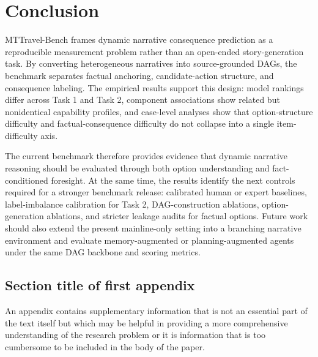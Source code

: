 \documentclass[pdflatex,sn-mathphys-num]{sn-jnl}%
\theoremstyle{thmstyleone}%
\theoremstyle{thmstyletwo}%
\theoremstyle{thmstylethree}%
\begin{document}
\section{Conclusion}
MTTravel-Bench frames dynamic narrative consequence prediction as a reproducible measurement problem rather than an open-ended story-generation task. By converting heterogeneous narratives into source-grounded DAGs, the benchmark separates factual anchoring, candidate-action structure, and consequence labeling. The empirical results support this design: model rankings differ across Task 1 and Task 2, component associations show related but nonidentical capability profiles, and case-level analyses show that option-structure difficulty and factual-consequence difficulty do not collapse into a single item-difficulty axis.

The current benchmark therefore provides evidence that dynamic narrative reasoning should be evaluated through both option understanding and fact-conditioned foresight. At the same time, the results identify the next controls required for a stronger benchmark release: calibrated human or expert baselines, label-imbalance calibration for Task 2, DAG-construction ablations, option-generation ablations, and stricter leakage audits for factual options. Future work should also extend the present mainline-only setting into a branching narrative environment and evaluate memory-augmented or planning-augmented agents under the same DAG backbone and scoring metrics.

\begin{appendices}

\section{Section title of first appendix}\label{secA1}

An appendix contains supplementary information that is not an essential part of the text itself but which may be helpful in providing a more comprehensive understanding of the research problem or it is information that is too cumbersome to be included in the body of the paper.




\end{appendices}
\end{document}
